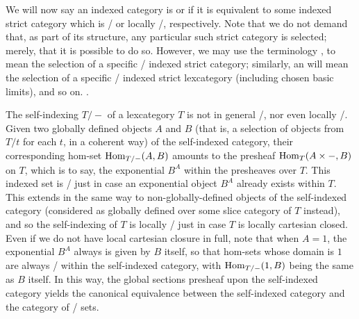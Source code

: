 \begin{definition}
We will now say an indexed category is  or  if it is equivalent to some indexed strict category which is \repsmall/ or locally \repsmall/, respectively. Note that we do not demand that, as part of its structure, any particular such strict category is selected; merely, that it is possible to do so. However, we may use the terminology , to mean the selection of a specific \repsmall/ indexed strict category; similarly, an  will mean the selection of a specific \repsmall/ indexed strict lexcategory (including chosen basic limits), and so on. .
\end{definition}

The self-indexing $T/-$ of a lexcategory $T$ is not in general \repsmall/, nor even locally \repsmall/. Given two globally defined objects $A$ and $B$ (that is, a selection of objects from $T/t$ for each $t$, in a coherent way)  of the self-indexed category, their corresponding hom-set $\operatorname{Hom}_{T/-}(A, B)$ amounts to the presheaf $\operatorname{Hom}_{T}(A \times -, B)$ on $T$, which is to say, the exponential $B^A$ within the presheaves over $T$. This indexed set is \repsmall/ just in case an exponential object $B^A$ already exists within $T$. This extends in the same way to non-globally-defined objects of the self-indexed category (considered as globally defined over some slice category of $T$ instead), and so the self-indexing of $T$ is locally \repsmall/ just in case $T$ is locally cartesian closed. Even if we do not have local cartesian closure in full, note that when $A = 1$, the exponential $B^A$ always is given by $B$ itself, so that hom-sets whose domain is $1$ are always \repsmall/ within the self-indexed category, with $\operatorname{Hom}_{T/-}(1, B)$ being the same as $B$ itself. In this way, the global sections presheaf upon the self-indexed category yields the canonical equivalence between the self-indexed category and the category of \repsmall/ sets.

